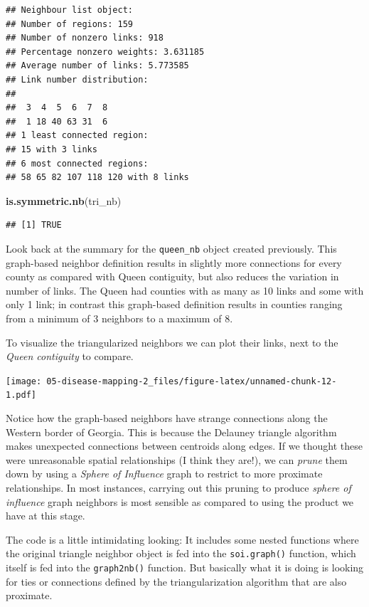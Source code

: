 \documentclass[
]{book}
\newenvironment{Shaded}{\begin{snugshade}}{\end{snugshade}}
\newcommand{\FunctionTok}[1]{\textcolor[rgb]{0.13,0.29,0.53}{\textbf{#1}}}
\newcommand{\NormalTok}[1]{#1}
\begin{document}
\begin{verbatim}
## Neighbour list object:
## Number of regions: 159 
## Number of nonzero links: 918 
## Percentage nonzero weights: 3.631185 
## Average number of links: 5.773585 
## Link number distribution:
## 
##  3  4  5  6  7  8 
##  1 18 40 63 31  6 
## 1 least connected region:
## 15 with 3 links
## 6 most connected regions:
## 58 65 82 107 118 120 with 8 links
\end{verbatim}

\begin{Shaded}
\begin{Highlighting}[]
\FunctionTok{is.symmetric.nb}\NormalTok{(tri\_nb)}
\end{Highlighting}
\end{Shaded}

\begin{verbatim}
## [1] TRUE
\end{verbatim}

Look back at the summary for the \texttt{queen\_nb} object created previously. This graph-based neighbor definition results in slightly more connections for every county as compared with Queen contiguity, but also reduces the variation in number of links. The Queen had counties with as many as 10 links and some with only 1 link; in contrast this graph-based definition results in counties ranging from a minimum of 3 neighbors to a maximum of 8.

To visualize the triangularized neighbors we can plot their links, next to the \emph{Queen contiguity} to compare.

\texttt{[image: 05-disease-mapping-2\_files/figure-latex/unnamed-chunk-12-1.pdf]}

Notice how the graph-based neighbors have strange connections along the Western border of Georgia. This is because the Delauney triangle algorithm makes unexpected connections between centroids along edges. If we thought these were unreasonable spatial relationships (I think they are!), we can \emph{prune} them down by using a \emph{Sphere of Influence} graph to restrict to more proximate relationships. In most instances, carrying out this pruning to produce \emph{sphere of influence} graph neighbors is most sensible as compared to using the product we have at this stage.

The code is a little intimidating looking: It includes some nested functions where the original triangle neighbor object is fed into the \texttt{soi.graph()} function, which itself is fed into the \texttt{graph2nb()} function. But basically what it is doing is looking for ties or connections defined by the triangularization algorithm that are also proximate.
\end{document}
